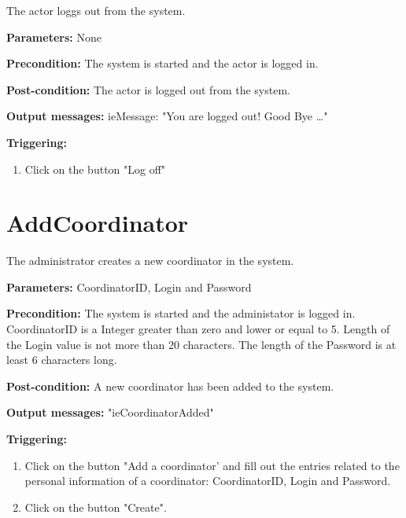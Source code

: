 The actor loggs out from the system.

\begin{description}
	\item \textbf{Parameters:} None
	\item \textbf{Precondition:} The system is started and the actor is logged in.
	\item \textbf{Post-condition:} The actor is logged out from the system.
	\item \textbf{Output messages:} ieMessage: "You are logged out! Good Bye
	\ldots"
	
	\item \textbf{Triggering:}
	
	\begin{enumerate}
		\item Click on the button "Log off"
	\end{enumerate}
\end{description}

\section{AddCoordinator}
\label{operation:AddCoordinator}

The administrator creates a new coordinator in the system.

\begin{description}
	\item \textbf{Parameters:} CoordinatorID, Login and Password
	\item \textbf{Precondition:} The system is started and the administator is
	logged in. CoordinatorID is a Integer greater than zero and lower or equal to
	5. Length of the Login value is not more than 20 characters. The length of the
	Password is at least 6 characters long.
	\item \textbf{Post-condition:} A new coordinator has been added to the system.
	\item \textbf{Output messages:} "ieCoordinatorAdded"
	
	\item \textbf{Triggering:}
	
	\begin{enumerate}
		\item Click on the button "Add a coordinator' and fill out the entries related
		to the personal information of a coordinator: CoordinatorID, Login and Password.
		\item Click on the button "Create".
	\end{enumerate}
\end{description}

